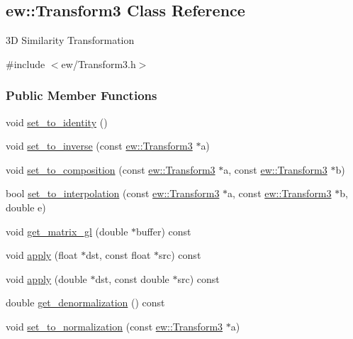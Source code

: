\hypertarget{classew_1_1Transform3}{
\subsection{ew::Transform3 Class Reference}
\label{classew_1_1Transform3}
}


3D Similarity Transformation  




{\ttfamily \#include $<$ew/Transform3.h$>$}

\subsubsection*{Public Member Functions}
\begin{DoxyCompactItemize}
\item 
void \hyperlink{classew_1_1Transform3_adf9b56b545a70d21c02d2912c368be20}{set\_\-to\_\-identity} ()
\item 
void \hyperlink{classew_1_1Transform3_ae5d2a34f86c25e013407bd1e3242118f}{set\_\-to\_\-inverse} (const \hyperlink{classew_1_1Transform3}{ew::Transform3} $\ast$a)
\item 
void \hyperlink{classew_1_1Transform3_a325fab07876e5adc555c934a5f69eaa7}{set\_\-to\_\-composition} (const \hyperlink{classew_1_1Transform3}{ew::Transform3} $\ast$a, const \hyperlink{classew_1_1Transform3}{ew::Transform3} $\ast$b)
\item 
bool \hyperlink{classew_1_1Transform3_a29fe78ccd6a5843daf4a1d20c57cf55b}{set\_\-to\_\-interpolation} (const \hyperlink{classew_1_1Transform3}{ew::Transform3} $\ast$a, const \hyperlink{classew_1_1Transform3}{ew::Transform3} $\ast$b, double e)
\item 
void \hyperlink{classew_1_1Transform3_abedae9930fc0fe058b50f80ec9c5b798}{get\_\-matrix\_\-gl} (double $\ast$buffer) const 
\item 
void \hyperlink{classew_1_1Transform3_a5f9ddcb7fbd7bb3969bfebf2fc30d87a}{apply} (float $\ast$dst, const float $\ast$src) const 
\item 
void \hyperlink{classew_1_1Transform3_abcba2d1c671b7701c80a38c79e0e0b3b}{apply} (double $\ast$dst, const double $\ast$src) const 
\item 
double \hyperlink{classew_1_1Transform3_abef663365b76a75a6c9436f6ff6de229}{get\_\-denormalization} () const 
\item 
void \hyperlink{classew_1_1Transform3_a04a2d12beb56abc7f4432957d7d2af3f}{set\_\-to\_\-normalization} (const \hyperlink{classew_1_1Transform3}{ew::Transform3} $\ast$a)

\end{DoxyCompactItemize}
